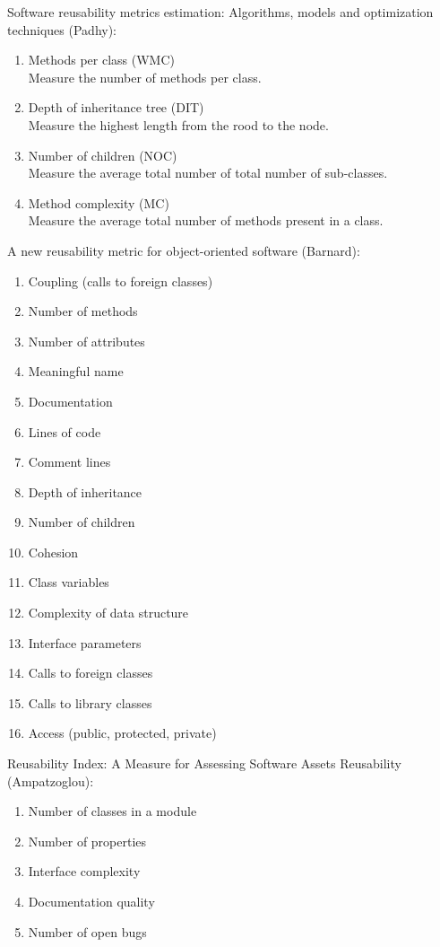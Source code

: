 \documentclass{article}
\begin{document}
\noindent Software reusability metrics estimation: Algorithms, models and optimization techniques (Padhy):\\ 
\begin{enumerate}
	\item Methods per class (WMC)\\
	
	Measure the number of methods per class.
	\item Depth of inheritance tree (DIT)\\
	
	Measure the highest length from the rood to the node.
	\item Number of children (NOC)\\
	
	Measure the average total number of total number of sub-classes.

	\item Method complexity (MC)\\
	
	Measure the average total number of methods present in a class.
\end{enumerate}

\noindent A new reusability metric for object-oriented software (Barnard):\\ 
\begin{enumerate}
	\item Coupling (calls to foreign classes)
	\item Number of methods
	\item Number of attributes
	\item Meaningful name
	\item Documentation
	\item Lines of code
	\item Comment lines
	\item Depth of inheritance
	\item Number of children
	\item Cohesion 
	\item Class variables
	\item Complexity of data structure
	\item Interface parameters
	\item Calls to foreign classes
	\item Calls to library classes
	\item Access (public, protected, private)
\end{enumerate}

\noindent Reusability Index: A Measure for Assessing Software Assets Reusability (Ampatzoglou):\\ 
\begin{enumerate}
	\item Number of classes in a module
	\item Number of properties
	\item Interface complexity
	\item Documentation quality
	\item Number of open bugs
\end{enumerate}
\end{document}
